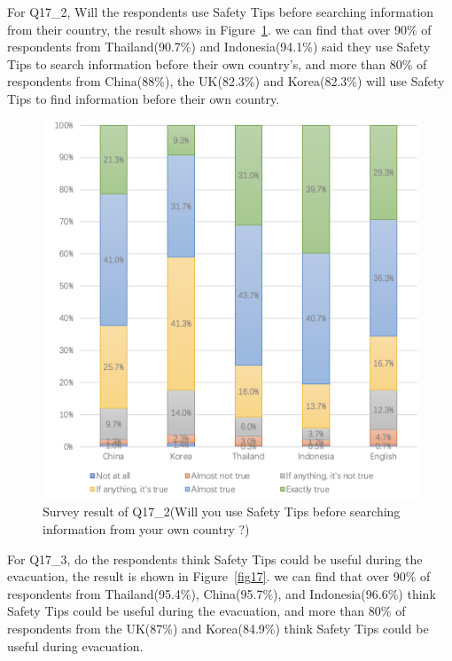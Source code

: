 For Q17\_2, Will the respondents use Safety Tips before searching information from their country, the result shows in Figure~\ref{fig16}. we can find that over 90\% of respondents from Thailand(90.7\%) and Indonesia(94.1\%) said they use Safety Tips to search information before their own country's, and more than 80\% of respondents from China(88\%), the UK(82.3\%) and Korea(82.3\%) will use Safety Tips to find information before their own country. 

\begin{figure}[h]
  \includegraphics[width=0.8\linewidth]{Figure/Figure16.jpg}
  \centering
  \caption[Survey result of Q17\_2]{Survey result of Q17\_2(Will you use Safety Tips before searching information from your own country ?)}
  \label{fig16}
\end{figure}

For Q17\_3, do the respondents think Safety Tips could be useful during the evacuation, the result is shown in Figure~\ref{fig17}. we can find that over 90\% of respondents from Thailand(95.4\%), China(95.7\%), and Indonesia(96.6\%) think Safety Tips could be useful during the evacuation, and more than 80\% of respondents from the UK(87\%) and Korea(84.9\%) think Safety Tips could be useful during evacuation. 

